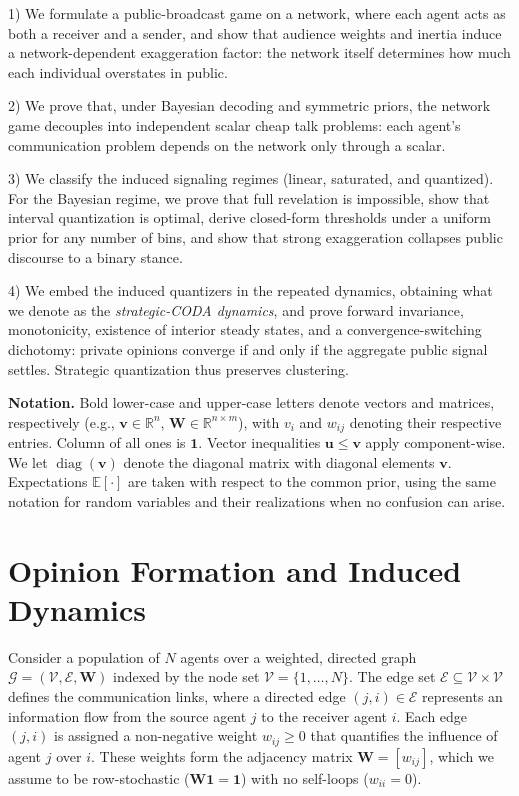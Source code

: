 \documentclass[journal,twoside,web]{ieeecolor}
\begin{document}
1) We formulate a public-broadcast game on a network, where each agent acts as both a receiver and a sender, and show that audience weights and inertia induce a network-dependent exaggeration factor: the network itself determines how much each individual overstates in public.

2) We prove that, under Bayesian decoding and symmetric priors, the network game decouples into independent scalar cheap talk problems: each agent's communication problem depends on the network only through a scalar.

3) We classify the induced signaling regimes (linear, saturated, and quantized). For the Bayesian regime, we prove that full revelation is impossible, show that interval quantization is optimal, derive closed-form thresholds under a uniform prior for any number of bins, and show that strong exaggeration collapses public discourse to a binary stance.

4) We embed the induced quantizers in the repeated dynamics, obtaining what we denote as the \emph{strategic-CODA dynamics}, and prove forward invariance, monotonicity, existence of interior steady states, and a convergence-switching dichotomy: private opinions converge if and only if the aggregate public signal settles. Strategic quantization thus preserves clustering.

\textbf{Notation.} Bold lower-case and upper-case letters denote vectors and matrices, respectively (e.g., $\bm{v} \in \mathbb{R}^n$, $\bm{W} \in \mathbb{R}^{n \times m}$), with $v_i$ and $w_{ij}$ denoting their respective entries. Column of all ones is $\bm{1}$. Vector inequalities $\bm{u} \leq \bm{v}$ apply component-wise. We let $\operatorname{diag}(\bm{v})$ denote the diagonal matrix with diagonal elements $\bm{v}$. 
Expectations $\mathbb{E}[\cdot]$ are taken with respect to the common prior, using the same notation for random variables and their realizations when no confusion can arise.

\section{Opinion Formation and Induced Dynamics}
\label{sec:problem_formulation}

Consider a population of $N$ agents over a weighted, directed graph $\mathcal{G} = (\mathcal{V}, \mathcal{E}, \bm{W})$ indexed by the node set $\mathcal{V} = \{1, \dots, N\}$. The edge set $\mathcal{E} \subseteq \mathcal{V} \times \mathcal{V}$ defines the communication links, where a directed edge $(j, i) \in \mathcal{E}$ represents an information flow from the source agent $j$ to the receiver agent $i$. Each edge $(j,i)$ is assigned a non-negative weight $w_{ij} \geq 0$ that quantifies the influence of agent $j$ over $i$. These weights form the adjacency matrix $\bm{W} = [w_{ij}]$, which we assume to be row-stochastic ($\bm{W}\bm{1} = \bm{1}$) with no self-loops ($w_{ii} = 0$).
\end{document}
